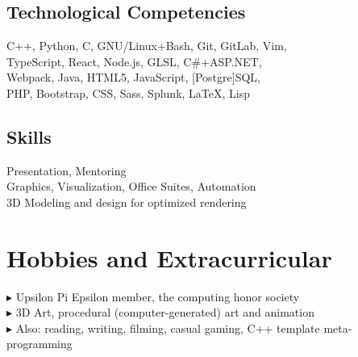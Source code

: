 \documentclass[Letterpaper,11pt]{article}
\newcommand{\bul}{$\blacktriangleright$ }
\begin{document}
\begin{multicols}{2}

    \subsection*{Technological Competencies}

        C++, Python, C, GNU/Linux+Bash, Git, GitLab, Vim, \\
        TypeScript, React, Node.js, GLSL, C\#+ASP.NET, \\
        Webpack, Java, HTML5, JavaScript, [Postgre]SQL, \\ 
        PHP, Bootstrap, CSS, Sass, Splunk, \LaTeX, Lisp \\

    \subsection*{Skills}

        Presentation, Mentoring\\
        Graphics, Visualization, Office Suites, Automation\\
        3D Modeling and design for optimized rendering

\end{multicols}

\section*{Hobbies and Extracurricular}

    \bul Upsilon Pi Epsilon member, the computing honor society\\
    \bul 3D Art, procedural (computer-generated) art and animation\\
    \bul Also: reading, writing, filming, casual gaming, C++ template meta-programming

\clearpage
\end{document}
